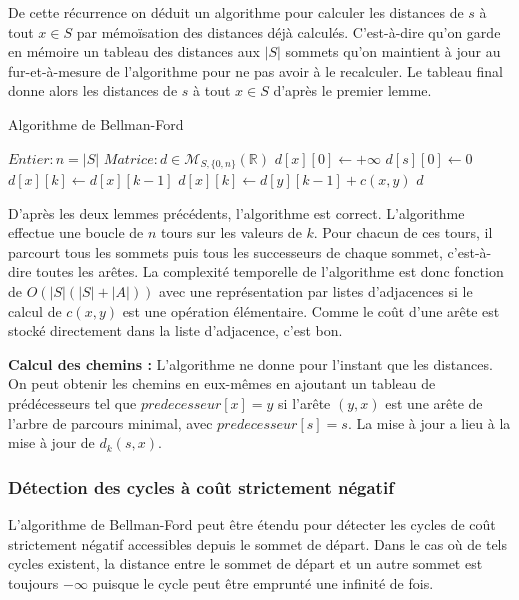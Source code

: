\documentclass[../../../main.tex]{subfiles}
\begin{document}
De cette récurrence on déduit un algorithme pour calculer les distances de $s$ à tout $x\in S$ par
mémoïsation des distances déjà calculés. C'est-à-dire qu'on garde en mémoire un tableau des distances
aux $|S|$ sommets qu'on maintient à jour au fur-et-à-mesure de l'algorithme pour ne pas avoir à le
recalculer. Le tableau final donne alors les distances de $s$ à tout $x\in S$ d'après le premier lemme.

\begin{algorithm}
\caption{Algorithme de Bellman-Ford\label{alg:bellmanford}}
$Entier:n = |S|$
$Matrice:d\in \mathcal{M}_{S, \{0, n\}}(\mathbb{R})$
 {
	$d[x][0]\leftarrow +\infty$\;
}
$d[s][0]\leftarrow 0$\;
 {
	 {
		$d[x][k] \leftarrow d[x][k-1]$\;
	}
	 {
		 {
			 {
				$d[x][k] \leftarrow d[y][k-1] + c(x, y)$
			}
		}
	}
}
\Return $d$
\end{algorithm}

D'après les deux lemmes précédents, l'algorithme est correct. L'algorithme effectue une boucle de
$n$ tours sur les valeurs de $k$. Pour chacun de ces tours, il parcourt tous les sommets puis tous les
successeurs de chaque sommet, c'est-à-dire toutes les arêtes. La complexité temporelle de l'algorithme
est donc fonction de $O(|S|(|S| + |A|))$ avec une représentation par listes d'adjacences si le calcul de
$c(x, y)$ est une opération élémentaire. Comme le coût d'une arête est stocké directement dans la liste
d'adjacence, c'est bon.

\textbf{Calcul des chemins :} L'algorithme ne donne pour l'instant que les distances. On peut obtenir les
chemins en eux-mêmes en ajoutant un tableau de prédécesseurs tel que $predecesseur[x] = y$ si l'arête
$(y, x)$ est une arête de l'arbre de parcours minimal, avec $predecesseur[s] = s$. La mise à jour a lieu à
la mise à jour de $d_k(s, x)$.
\subsubsection{Détection des cycles à coût strictement négatif}
L'algorithme de Bellman-Ford peut être étendu pour détecter les cycles de coût strictement négatif accessibles depuis le sommet de départ. Dans le cas où de tels cycles existent, la distance entre le sommet de départ et un autre sommet est toujours $-\infty$ puisque le cycle peut être emprunté une infinité de fois.
\end{document}
